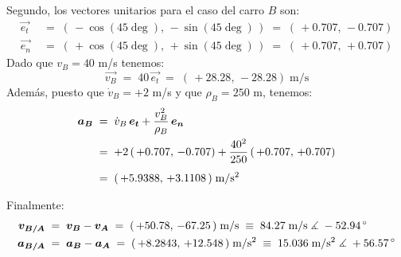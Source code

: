 \documentclass[ a4paper, twoside, 11pt]{article}
\begin{document}
\begin{problem}
Segundo, los vectores unitarios para el caso del carro $B$ son: 
\begin{align*}
\vec{e_t} \; & = \; ( \, -\cos(45\deg), \, -\sin(45\deg) \, )
\; = \; ( \, +0.707, \, -0.707) \\
\vec{e_n} \; & = \; ( \, +\cos(45\deg), \, +\sin(45\deg) \, )
\; = \; ( \, +0.707, \, +0.707)
\end{align*}
Dado que $v_B = 40$ m/s tenemos: 
\[
\vec{v_B} \; = \; 40 \, \vec{e_t}
\; = \; ( \, +28.28, \, -28.28) \; \text{m/s}
\]
Adem\'as, puesto que $\dot{v}_B = +2$ m/s y que $\rho_B = 250$ m, tenemos: 
\begin{align*}
{\boldsymbol{a_B}} \; & = \;
\dot{v}_B \, {\boldsymbol{e_t}} + \frac{v_B^2}{\rho_B} \, {\boldsymbol{e_n}} \\
& = \; +2 \, ( \, +0.707, \, -0.707)
+ \frac{40^2}{250} \, ( \, +0.707, \, +0.707) \\[1ex]
& = \; ( \, +5.9388, \, +3.1108 \, ) \; \text{m/s\ensuremath{^{\text{2}}}}
\end{align*}

Finalmente: 
\begin{align*}
{\boldsymbol{v_{B/A}}} \; & = \; {\boldsymbol{v_B}} - {\boldsymbol{v_A}}
\; = \; ( \, +50.78, \, -67.25 \, ) \; \text{m/s}
\; \equiv \; 84.27 \; \text{m/s} \; \measuredangle \; -52.94^{\,\circ} \\
{\boldsymbol{a_{B/A}}} \; & = \; {\boldsymbol{a_B}} - {\boldsymbol{a_A}}
\; = \; ( \, +8.2843, \, +12.548 \, ) \; \text{m/s\ensuremath{^{\text{2}}}}
\; \equiv \; 15.036 \; \text{m/s\ensuremath{^{\text{2}}}} \; \measuredangle \; +56.57^{\,\circ}
\end{align*}

\end{problem}
\fullskip
\end{document}
